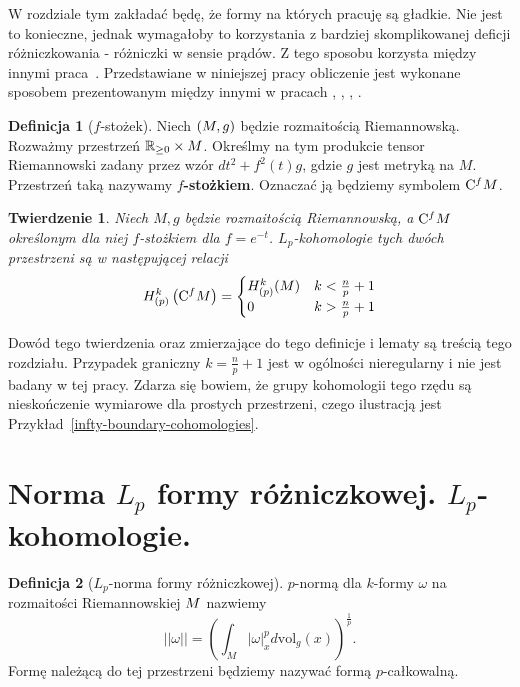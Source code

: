 \documentclass[licencjacka]{pracamgr}
\theoremstyle{definition}
\newtheorem{definition}{Definicja}[section]
\theoremstyle{definition}
\theoremstyle{plain}
\theoremstyle{plain}
\theoremstyle{plain}
\newtheorem{theorem}{Twierdzenie}[section]
\theoremstyle{plain}
\theoremstyle{plain}
\def\cfm{\ensuremath\mathrm{C}^fM}
\def\M{\ensuremath M}
\begin{document}
W rozdziale tym zakładać będę, że formy na których pracuję są gładkie. Nie jest
to konieczne, jednak wymagałoby to korzystania z bardziej skomplikowanej
deficji różniczkowania - różniczki w sensie prądów. Z tego sposobu korzysta
między innymi praca~\cite{weber}.  Przedstawiane w niniejszej pracy obliczenie
jest wykonane sposobem prezentowanym między innymi w pracach \cite{cheeger},
\cite{youssin}, \cite{kirwan}, \cite{weber}. 

\begin{definition}[$f$-stożek]
    Niech $(\M, g)$ będzie rozmaitością Riemannowską. Rozważmy przestrzeń
    $\mathbb{R}_{\geq 0} \times \M$. Określmy na tym produkcie tensor
    Riemannowski zadany przez wzór $dt^2 + f^{2}(t)g $, gdzie $g$ jest
    metryką na $M$.  Przestrzeń taką nazywamy \textbf{$f$-stożkiem}.
    Oznaczać ją będziemy symbolem $\cfm$.
\end{definition}

\begin{theorem}\label{main-theorem}
  Niech $M,g$ będzie rozmaitością Riemannowską, a $\cfm$ określonym dla niej
  $f$-stożkiem dla $f = e^{-t}$. $L_p$-kohomologie tych dwóch przestrzeni są
  w następującej relacji
  \begin{equation}
    H_{(p)}^k \left( \cfm \right) = \begin{cases}
      H_{(p)}^k(M) & k < \frac{n}{p} + 1 \\
      0 & k >  \frac{n}{p} + 1 \\
      \end{cases}
  \end{equation}
\end{theorem}
Dowód tego twierdzenia oraz zmierzające do tego definicje i lematy są treścią
tego rozdziału.  Przypadek graniczny $k = \frac{n}{p} + 1$ jest w ogólności
nieregularny i nie jest badany w tej pracy. Zdarza się bowiem, że grupy
kohomologii tego rzędu są nieskończenie wymiarowe dla prostych przestrzeni,
czego ilustracją jest Przykład~\ref{infty-boundary-cohomologies}. \\

\section{Norma $L_p$ formy różniczkowej. $L_p$-kohomologie.}


\begin{definition}[$L_p$-norma formy różniczkowej]
$p$-normą dla $k$-formy $\omega$ na rozmaitości Riemannowskiej $\M$ nazwiemy
\begin{equation} \label{big-norm}
|| \omega || = \left( \int_M |\omega|_x^p d \text{vol}_g(x) \right)^{\frac{1}{p}}.
\end{equation}
Formę należącą do tej przestrzeni będziemy nazywać formą $p$-całkowalną.
\end{definition}
\end{document}

